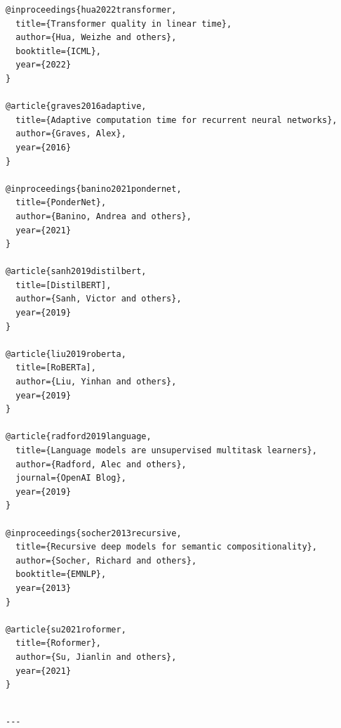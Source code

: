 \begin{lstlisting}
@inproceedings{hua2022transformer,
  title={Transformer quality in linear time},
  author={Hua, Weizhe and others},
  booktitle={ICML},
  year={2022}
}

@article{graves2016adaptive,
  title={Adaptive computation time for recurrent neural networks},
  author={Graves, Alex},
  year={2016}
}

@inproceedings{banino2021pondernet,
  title={PonderNet},
  author={Banino, Andrea and others},
  year={2021}
}

@article{sanh2019distilbert,
  title=[DistilBERT],
  author={Sanh, Victor and others},
  year={2019}
}

@article{liu2019roberta,
  title=[RoBERTa],
  author={Liu, Yinhan and others},
  year={2019}
}

@article{radford2019language,
  title={Language models are unsupervised multitask learners},
  author={Radford, Alec and others},
  journal={OpenAI Blog},
  year={2019}
}

@inproceedings{socher2013recursive,
  title={Recursive deep models for semantic compositionality},
  author={Socher, Richard and others},
  booktitle={EMNLP},
  year={2013}
}

@article{su2021roformer,
  title={Roformer},
  author={Su, Jianlin and others},
  year={2021}
}
\end{lstlisting}
\begin{lstlisting}

---
\end{lstlisting}